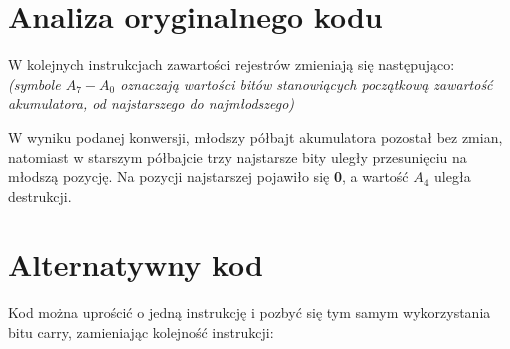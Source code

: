 \documentclass[a4paper,12pt]{extarticle}  %
\begin{document}
\section{Analiza oryginalnego kodu}

W kolejnych instrukcjach zawartości rejestrów zmieniają się następująco:\\
\emph{(symbole $A_7-A_0$ oznaczają wartości bitów stanowiących początkową zawartość akumulatora, od najstarszego do najmłodszego)}

\begin{table}[H]
	\centering
\end{table}
W wyniku podanej konwersji, młodszy półbajt akumulatora pozostał bez zmian, natomiast w starszym półbajcie trzy najstarsze bity uległy przesunięciu na młodszą pozycję.
Na pozycji najstarszej pojawiło się \textbf{0}, a wartość \textbf{$A_4$} uległa destrukcji.
\clearpage
\section{Alternatywny kod}
Kod można uprościć o jedną instrukcję i pozbyć się tym samym wykorzystania bitu carry, zamieniając kolejność instrukcji:

\begin{table}[H]
	\centering
\end{table}
\end{document}
